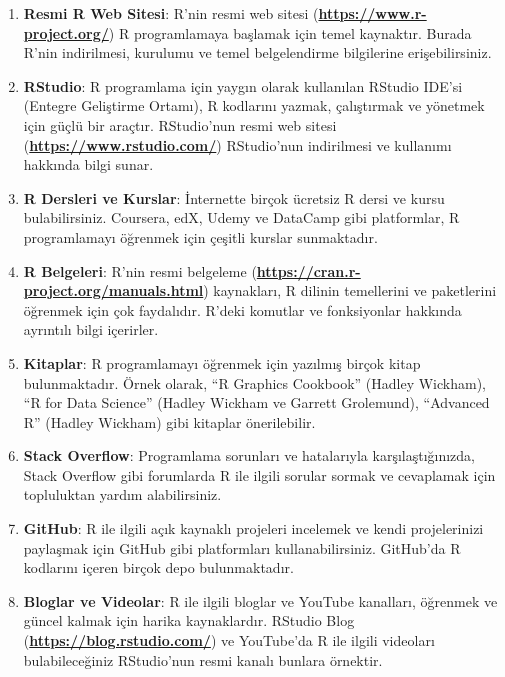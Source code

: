 \documentclass[
  letterpaper,
  DIV=11,
  numbers=noendperiod]{scrreprt}
\begin{document}
\begin{enumerate}
\def\labelenumi{\arabic{enumi}.}
\item
  \textbf{Resmi R Web Sitesi}: R'nin resmi web sitesi
  (\href{https://www.r-project.org/}{\textbf{https://www.r-project.org/}})
  R programlamaya başlamak için temel kaynaktır. Burada R'nin
  indirilmesi, kurulumu ve temel belgelendirme bilgilerine
  erişebilirsiniz.
\item
  \textbf{RStudio}: R programlama için yaygın olarak kullanılan RStudio
  IDE'si (Entegre Geliştirme Ortamı), R kodlarını yazmak, çalıştırmak ve
  yönetmek için güçlü bir araçtır. RStudio'nun resmi web sitesi
  (\href{https://www.rstudio.com/}{\textbf{https://www.rstudio.com/}})
  RStudio'nun indirilmesi ve kullanımı hakkında bilgi sunar.
\item
  \textbf{R Dersleri ve Kurslar}: İnternette birçok ücretsiz R dersi ve
  kursu bulabilirsiniz. Coursera, edX, Udemy ve DataCamp gibi
  platformlar, R programlamayı öğrenmek için çeşitli kurslar
  sunmaktadır.
\item
  \textbf{R Belgeleri}: R'nin resmi belgeleme
  (\href{https://cran.r-project.org/manuals.html}{\textbf{https://cran.r-project.org/manuals.html}})
  kaynakları, R dilinin temellerini ve paketlerini öğrenmek için çok
  faydalıdır. R'deki komutlar ve fonksiyonlar hakkında ayrıntılı bilgi
  içerirler.
\item
  \textbf{Kitaplar}: R programlamayı öğrenmek için yazılmış birçok kitap
  bulunmaktadır. Örnek olarak, ``R Graphics Cookbook'' (Hadley Wickham),
  ``R for Data Science'' (Hadley Wickham ve Garrett Grolemund),
  ``Advanced R'' (Hadley Wickham) gibi kitaplar önerilebilir.
\item
  \textbf{Stack Overflow}: Programlama sorunları ve hatalarıyla
  karşılaştığınızda, Stack Overflow gibi forumlarda R ile ilgili sorular
  sormak ve cevaplamak için topluluktan yardım alabilirsiniz.
\item
  \textbf{GitHub}: R ile ilgili açık kaynaklı projeleri incelemek ve
  kendi projelerinizi paylaşmak için GitHub gibi platformları
  kullanabilirsiniz. GitHub'da R kodlarını içeren birçok depo
  bulunmaktadır.
\item
  \textbf{Bloglar ve Videolar}: R ile ilgili bloglar ve YouTube
  kanalları, öğrenmek ve güncel kalmak için harika kaynaklardır. RStudio
  Blog
  (\href{https://blog.rstudio.com/}{\textbf{https://blog.rstudio.com/}})
  ve YouTube'da R ile ilgili videoları bulabileceğiniz RStudio'nun resmi
  kanalı bunlara örnektir.
\end{enumerate}
\end{document}
